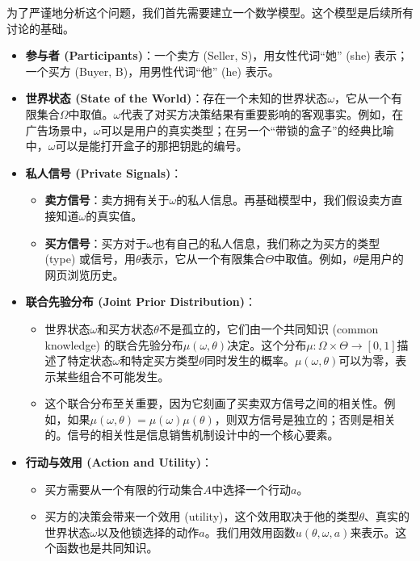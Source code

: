  为了严谨地分析这个问题，我们首先需要建立一个数学模型。这个模型是后续所有讨论的基础。

 \begin{itemize}
    \item \textbf{参与者 (Participants)}：一个卖方 (Seller, S)，用女性代词“她” (she) 表示；一个买方 (Buyer, B)，用男性代词“他” (he) 表示。
    \item \textbf{世界状态 (State of the World)}：存在一个未知的世界状态$\omega$，它从一个有限集合$\Omega$中取值。$\omega$代表了对买方决策结果有重要影响的客观事实。例如，在广告场景中，$\omega$可以是用户的真实类型；在另一个“带锁的盒子”的经典比喻中，$\omega$可以是能打开盒子的那把钥匙的编号。
    \item \textbf{私人信号 (Private Signals)}：
       \begin{itemize}
         \item \textbf{卖方信号}：卖方拥有关于$\omega$的私人信息。再基础模型中，我们假设卖方直接知道$\omega$的真实值。
         \item \textbf{买方信号}：买方对于$\omega$也有自己的私人信息，我们称之为买方的类型 (type) 或信号，用$\theta$表示，它从一个有限集合$\Theta$中取值。例如，$\theta$是用户的网页浏览历史。
       \end{itemize}
    \item \textbf{联合先验分布 (Joint Prior Distribution)}：
       \begin{itemize}
         \item 世界状态$\omega$和买方状态$\theta$不是孤立的，它们由一个共同知识 (common knowledge) 的联合先验分布$\mu(\omega,\theta)$决定。这个分布$\mu:\Omega \times \Theta \to [0,1]$描述了特定状态$\omega$和特定买方类型$\theta$同时发生的概率。$\mu(\omega,\theta)$可以为零，表示某些组合不可能发生。
         \item 这个联合分布至关重要，因为它刻画了买卖双方信号之间的相关性。例如，如果$\mu(\omega,\theta)=\mu(\omega)\mu(\theta)$，则双方信号是独立的；否则是相关的。信号的相关性是信息销售机制设计中的一个核心要素。
       \end{itemize}
    \item \textbf{行动与效用 (Action and Utility)}：
       \begin{itemize}
         \item 买方需要从一个有限的行动集合$A$中选择一个行动$a$。
         \item 买方的决策会带来一个效用 (utility)，这个效用取决于他的类型$\theta$、真实的世界状态$\omega$以及他锁选择的动作$a$。我们用效用函数$u(\theta,\omega,a)$来表示。这个函数也是共同知识。

\end{itemize}
\end{itemize}
